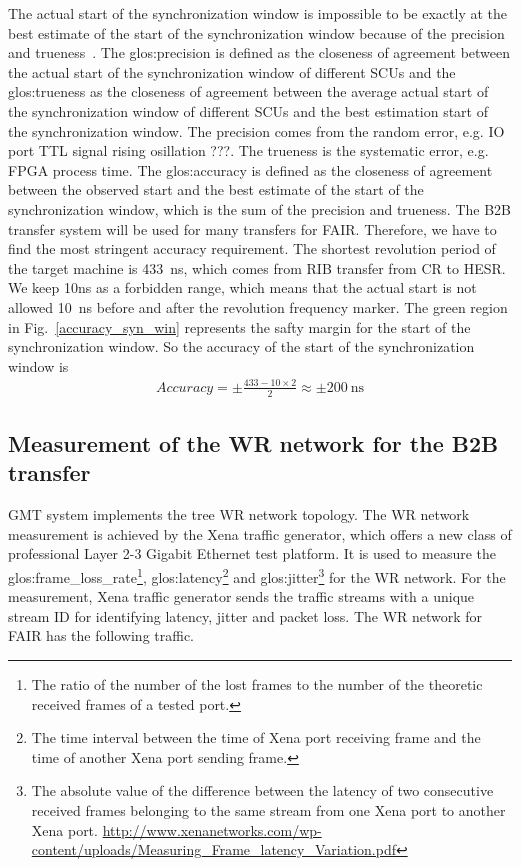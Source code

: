 The actual start of the synchronization window is impossible to be exactly at the best estimate of the start of the synchronization window because of the precision and trueness~\cite{Accuracy}. The \gls{glos:precision} is defined as the closeness of agreement between the actual start of the synchronization window of different SCUs and the \gls{glos:trueness} as the closeness of agreement between the average actual start of the synchronization window of different SCUs and the best estimation start of the synchronization window. The precision comes from the random error, e.g. IO port \gls{TTL} signal rising osillation ???. The trueness is the systematic error, e.g. FPGA process time. The \gls{glos:accuracy} is defined as the closeness of agreement between the observed start and the best estimate of the start of the synchronization window, which is the sum of the precision and trueness. The B2B transfer system will be used for many transfers for FAIR. Therefore, we have to find the most stringent accuracy requirement. The shortest revolution period of the target machine is \SI{433}{\ns}, which comes from RIB transfer from CR to HESR. We keep 10ns as a forbidden range, which means that the actual start is not allowed \SI{10}{\ns} before and after the revolution frequency marker. The green region in Fig.~\ref{accuracy_syn_win} represents the safty margin for the start of the synchronization window. So the accuracy of the start of the synchronization window is 
\begin{equation}
\begin{aligned}
Accuracy=\pm\frac{433-10 \times 2}{2}\approx \pm \SI{200}{\ns}
\end{aligned}
\end{equation}

\subsection{Measurement of the WR network for the B2B transfer}
GMT system implements the tree WR network topology. The WR network measurement is achieved by the Xena traffic generator, which offers a new class of professional Layer 2-3 Gigabit Ethernet test platform. It is used to measure the \gls{glos:frame_loss_rate}\footnote{The ratio of the number of the lost frames to the number of the theoretic received frames of a tested port.}, \gls{glos:latency}\footnote{The time interval between the time of Xena port receiving frame and the time of another Xena port sending frame.} and \gls{glos:jitter}\footnote{The absolute value of the difference between the latency of two consecutive received frames belonging to the same stream from one Xena port to another Xena port. \newline\url{http://www.xenanetworks.com/wp-content/uploads/Measuring_Frame_latency_Variation.pdf}} for the WR network. For the measurement, Xena traffic generator sends the traffic streams with a unique stream ID for identifying latency, jitter and packet loss. The WR network for FAIR has the following traffic.

